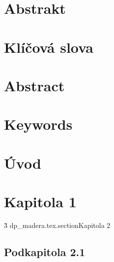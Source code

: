 \documentclass[a4paper,11pt,titlepage,fleqn]{article}
\begin{document}


\setcounter{page}{3}

\newpage
\thispagestyle{plain}
\section*{Abstrakt}


\section*{Klíčová slova}


\thispagestyle{empty}
\newpage

\section*{Abstract}

\section*{Keywords}


\thispagestyle{empty}

\newpage
\tableofcontents
\newpage
\listoffigures
\listoftables
\lstlistoflistings
\newpage
\printglossary[type=\acronymtype,title=Seznam zkratek]
\cleardoublepage


\section{Úvod}


\newpage
\section{Kapitola 1}

\newpage
\.3 dp\_madera.tex.section{Kapitola 2}
\label{kapitola}

\subsection{Podkapitola 2.1} 
\label{kapitola21}

\end{document}
